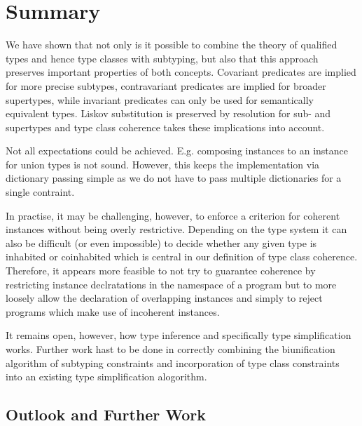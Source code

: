 
\chapter{Summary}
\label{ch:summary}

We have shown that not only is it possible to combine the theory of qualified types and hence type classes with subtyping, but also that this approach preserves important properties of both concepts.
Covariant predicates are implied for more precise subtypes, contravariant predicates are implied for broader supertypes, while invariant predicates can only be used for semantically equivalent types.
Liskov substitution is preserved by resolution for sub- and supertypes and type class coherence takes these implications into account.

Not all expectations could be achieved.
E.g. composing instances to an instance for union types is not sound.
However, this keeps the implementation via dictionary passing simple as we do not have to pass multiple dictionaries for a single contraint.

In practise, it may be challenging, however, to enforce a criterion for coherent instances without being overly restrictive.
Depending on the type system it can also be difficult (or even impossible) to decide whether any given type is inhabited or coinhabited which is central in our definition of type class coherence.
Therefore, it appears more feasible to not try to guarantee coherence by restricting instance declratations in the namespace of a program but to more loosely allow the declaration of overlapping instances and simply to reject programs which make use of incoherent instances.

It remains open, however, how type inference and specifically type simplification works.
Further work hast to be done in correctly combining the biunification algorithm of subtyping constraints and incorporation of type class constraints into an existing type simplification alogorithm.


\section{Outlook and Further Work}

